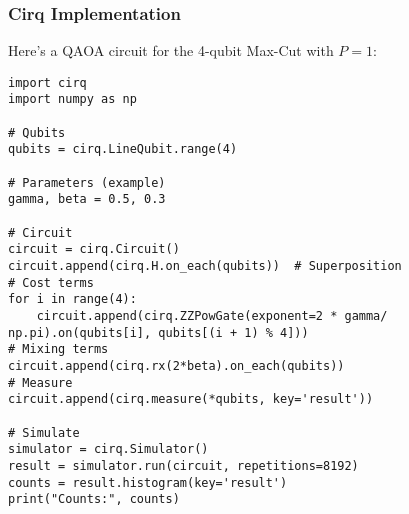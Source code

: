 
\subsubsection*{Cirq Implementation}

Here’s a QAOA circuit for the 4-qubit Max-Cut with $P=1$:

\begin{verbatim}
import cirq
import numpy as np

# Qubits
qubits = cirq.LineQubit.range(4)

# Parameters (example)
gamma, beta = 0.5, 0.3

# Circuit
circuit = cirq.Circuit()
circuit.append(cirq.H.on_each(qubits))  # Superposition
# Cost terms
for i in range(4):
    circuit.append(cirq.ZZPowGate(exponent=2 * gamma/ np.pi).on(qubits[i], qubits[(i + 1) % 4]))
# Mixing terms
circuit.append(cirq.rx(2*beta).on_each(qubits))
# Measure
circuit.append(cirq.measure(*qubits, key='result'))

# Simulate
simulator = cirq.Simulator()
result = simulator.run(circuit, repetitions=8192)
counts = result.histogram(key='result')
print("Counts:", counts)
\end{verbatim}

